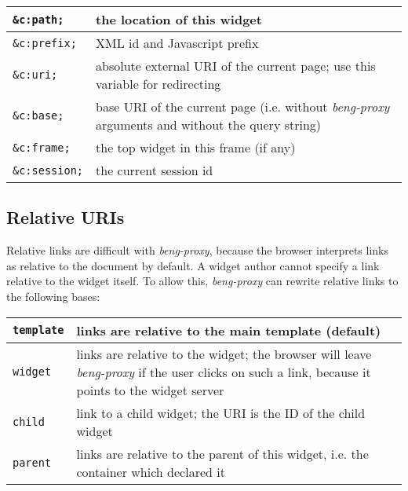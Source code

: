 \documentclass[a4paper,12pt]{article}
\begin{document}
\begin{tabular}{|l|p{8cm}|}
\hline
\texttt{\&c:path;} & the location of this widget \\
\hline
\texttt{\&c:prefix;} & XML id and Javascript prefix \\
\hline
\texttt{\&c:uri;} & absolute external URI of the current page; use
this variable for redirecting \\
\hline

\texttt{\&c:base;} & base URI of the current page (i.e. without
\emph{beng-proxy} arguments and without the query string) \\

\hline
\texttt{\&c:frame;} & the top widget in this frame (if any) \\
\hline
\texttt{\&c:session;} & the current session id \\
\hline
\end{tabular}

\subsection{Relative URIs}

Relative links are difficult with \emph{beng-proxy}, because the
browser interprets links as relative to the document by default.  A
widget author cannot specify a link relative to the widget itself.  To
allow this, \emph{beng-proxy} can rewrite relative links to the
following bases:

\begin{tabular}{|l|p{10cm}|}
\hline

\texttt{template} & links are relative to the main template (default)
\\

\hline

\texttt{widget} & links are relative to the widget; the browser will
leave \emph{beng-proxy} if the user clicks on such a link, because it
points to the widget server \\

\hline

\texttt{child} & link to a child widget; the URI is the ID of the
child widget \\

\hline

\texttt{parent} & links are relative to the parent of this widget,
i.e. the container which declared it \\

\hline
\end{tabular}
\end{document}
